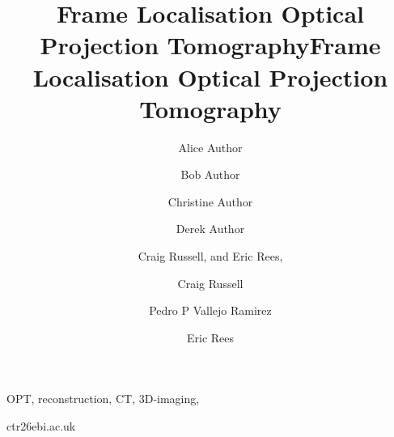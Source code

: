 \documentclass{osa-article}
\begin{document}
\title{Frame Localisation Optical Projection Tomography}

\ifdefined\nature

  \author[1,*]{Alice Author}
  \author[2]{Bob Author}
  \author[1,2,+]{Christine Author}
  \author[2,+]{Derek Author}


  \flushbottom
\fi
\ifdefined\osa
  \author{Craig Russell, and Eric Rees,}

  \address{Dept. of Chemical Engineering and Biotechnology, Cambridge University, Cambridge, U.K. \\
     European Bioinformatics Institute, Wellcome Genome Campus, Cambridge CB10 1SD}
\fi
\ifdefined\bioarxiv
  \title{Frame Localisation Optical Projection Tomography}
  \author[1,2 \Letter]{Craig Russell}
  \author[1]{Pedro P Vallejo Ramirez}
  \author[1]{Eric Rees}




  \maketitle

  \linenumbers{}


  \begin{keywords}
    OPT, reconstruction, CT, 3D-imaging,
  \end{keywords}

  \begin{corrauthor}
    ctr26\at ebi.ac.uk
  \end{corrauthor}
\end{document}
